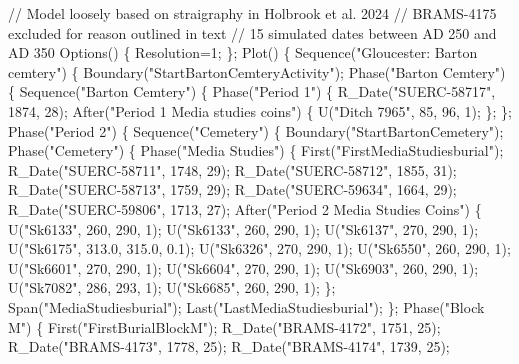 \documentclass[
]{agujournal2019}
\newenvironment{Shaded}{\begin{snugshade}}{\end{snugshade}}
\newcommand{\NormalTok}[1]{\textcolor[rgb]{0.00,0.23,0.31}{#1}}
\begin{document}
\begin{tcolorbox}
\begin{Shaded}
\begin{Highlighting}[]
\NormalTok{ // Model loosely based on straigraphy in Holbrook et al. 2024}
\NormalTok{ // BRAMS{-}4175 excluded for reason outlined in text}
\NormalTok{ // 15 simulated dates between AD 250 and AD 350 }
\NormalTok{ Options()}
\NormalTok{ \{}
\NormalTok{  Resolution=1;}
\NormalTok{ \};}
\NormalTok{ Plot()}
\NormalTok{ \{}
\NormalTok{  Sequence("Gloucester: Barton cemtery")}
\NormalTok{  \{}
\NormalTok{   Boundary("StartBartonCemteryActivity");}
\NormalTok{   Phase("Barton Cemtery")}
\NormalTok{   \{}
\NormalTok{    Sequence("Barton Cemtery")}
\NormalTok{    \{}
\NormalTok{     Phase("Period 1")}
\NormalTok{     \{}
\NormalTok{      R\_Date("SUERC{-}58717", 1874, 28);}
\NormalTok{      After("Period 1 Media studies coins")}
\NormalTok{      \{}
\NormalTok{       U("Ditch 7965", 85, 96, 1);}
\NormalTok{      \};}
\NormalTok{     \};}
\NormalTok{     Phase("Period 2")}
\NormalTok{     \{}
\NormalTok{      Sequence("Cemetery")}
\NormalTok{      \{}
\NormalTok{       Boundary("StartBartonCemetery");}
\NormalTok{       Phase("Cemetery")}
\NormalTok{       \{}
\NormalTok{        Phase("Media Studies")}
\NormalTok{        \{}
\NormalTok{         First("FirstMediaStudiesburial");}
\NormalTok{         R\_Date("SUERC{-}58711", 1748, 29);}
\NormalTok{         R\_Date("SUERC{-}58712", 1855, 31);}
\NormalTok{         R\_Date("SUERC{-}58713", 1759, 29);}
\NormalTok{         R\_Date("SUERC{-}59634", 1664, 29);}
\NormalTok{         R\_Date("SUERC{-}59806", 1713, 27);}
\NormalTok{         After("Period 2 Media Studies Coins")}
\NormalTok{         \{}
\NormalTok{          U("Sk6133", 260, 290, 1);}
\NormalTok{          U("Sk6133", 260, 290, 1);}
\NormalTok{          U("Sk6137", 270, 290, 1);}
\NormalTok{          U("Sk6175", 313.0, 315.0, 0.1);}
\NormalTok{          U("Sk6326", 270, 290, 1);}
\NormalTok{          U("Sk6550", 260, 290, 1);}
\NormalTok{          U("Sk6601", 270, 290, 1);}
\NormalTok{          U("Sk6604", 270, 290, 1);}
\NormalTok{          U("Sk6903", 260, 290, 1);}
\NormalTok{          U("Sk7082", 286, 293, 1);}
\NormalTok{          U("Sk6685", 260, 290, 1);}
\NormalTok{         \};}
\NormalTok{         Span("MediaStudiesburial");}
\NormalTok{         Last("LastMediaStudiesburial");}
\NormalTok{        \};}
\NormalTok{        Phase("Block M")}
\NormalTok{        \{}
\NormalTok{         First("FirstBurialBlockM");}
\NormalTok{         R\_Date("BRAMS{-}4172", 1751, 25);}
\NormalTok{         R\_Date("BRAMS{-}4173", 1778, 25);}
\NormalTok{         R\_Date("BRAMS{-}4174", 1739, 25);}

\end{Highlighting}
\end{Shaded}
\end{tcolorbox}
\end{document}
